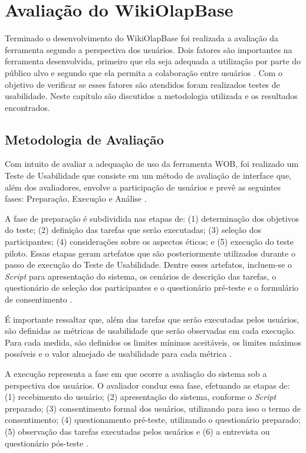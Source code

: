 \chapter{Avaliação do WikiOlapBase}
\label{chap:avaliacao}

Terminado o desenvolvimento do WikiOlapBase foi realizada a avaliação da ferramenta segundo
a perspectiva dos usuários. Dois fatores são importantes na ferramenta desenvolvida, primeiro 
que ela seja adequada a utilização por parte do público alvo e segundo que ela permita a 
colaboração entre usuários \cite{barbosa2010}. Com o objetivo de verificar se esses 
fatores são atendidos foram realizados testes de usabilidade. Neste capítulo são discutidos a 
metodologia utilizada e os resultados encontrados.

\section{Metodologia de Avaliação}
\label{sec:metodologia-avaliacao}

Com intuito de avaliar a adequação de uso da ferramenta WOB, foi realizado um Teste de 
Usabilidade que consiste em um método de avaliação de interface que, além dos avaliadores,
envolve a participação de usuários e prevê as seguintes fases: Preparação, Execução e 
Análise \cite{barbosa2010}.

A fase de preparação é subdividida nas etapas de: (1) determinação dos objetivos do teste; 
(2) definição das tarefas que serão executadas; (3) seleção dos participantes; (4) 
considerações sobre os aspectos éticos; e (5) execução do teste piloto. Essas etapas geram 
artefatos que são posteriormente utilizados durante o passo de execução do Teste de 
Usabilidade. Dentre esses artefatos, incluem-se o \textit{Script} para apresentação do sistema, 
os  cenários de descrição das tarefas, o questionário de seleção dos participantes e o 
questionário pré-teste e o formulário de consentimento \cite{barbosa2010}.

É importante ressaltar que, além das tarefas que serão executadas pelos usuários, são 
definidas as métricas de usabilidade que serão observadas em cada execução. Para cada 
medida, são definidos os limites mínimos aceitáveis, os limites máximos possíveis e o 
valor almejado de usabilidade para cada métrica \cite{barbosa2010}.

A execução representa a fase em que ocorre a avaliação do sistema sob a perspectiva dos 
usuários. O avaliador conduz essa fase, efetuando as etapas de: (1) recebimento do usuário; 
(2) apresentação do sistema, conforme o \textit{Script} preparado; (3) consentimento formal dos 
usuários, utilizando para isso o termo de consentimento; (4) questionamento pré-teste, 
utilizando o questionário preparado; (5) observação das tarefas executadas pelos usuários e 
(6) a entrevista ou questionário pós-teste \cite{barbosa2010}.

